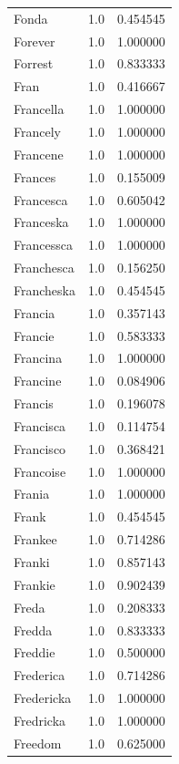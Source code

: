 \documentclass[
  letterpaper,
  DIV=11,
  numbers=noendperiod]{scrreprt}
\begin{document}
\begin{tabular}{lrr}
Fonda           &   1.0 &   0.454545 \\
Forever         &   1.0 &   1.000000 \\
Forrest         &   1.0 &   0.833333 \\
Fran            &   1.0 &   0.416667 \\
Francella       &   1.0 &   1.000000 \\
Francely        &   1.0 &   1.000000 \\
Francene        &   1.0 &   1.000000 \\
Frances         &   1.0 &   0.155009 \\
Francesca       &   1.0 &   0.605042 \\
Franceska       &   1.0 &   1.000000 \\
Francessca      &   1.0 &   1.000000 \\
Franchesca      &   1.0 &   0.156250 \\
Francheska      &   1.0 &   0.454545 \\
Francia         &   1.0 &   0.357143 \\
Francie         &   1.0 &   0.583333 \\
Francina        &   1.0 &   1.000000 \\
Francine        &   1.0 &   0.084906 \\
Francis         &   1.0 &   0.196078 \\
Francisca       &   1.0 &   0.114754 \\
Francisco       &   1.0 &   0.368421 \\
Francoise       &   1.0 &   1.000000 \\
Frania          &   1.0 &   1.000000 \\
Frank           &   1.0 &   0.454545 \\
Frankee         &   1.0 &   0.714286 \\
Franki          &   1.0 &   0.857143 \\
Frankie         &   1.0 &   0.902439 \\
Freda           &   1.0 &   0.208333 \\
Fredda          &   1.0 &   0.833333 \\
Freddie         &   1.0 &   0.500000 \\
Frederica       &   1.0 &   0.714286 \\
Fredericka      &   1.0 &   1.000000 \\
Fredricka       &   1.0 &   1.000000 \\
Freedom         &   1.0 &   0.625000 \\

\end{tabular}
\end{document}
